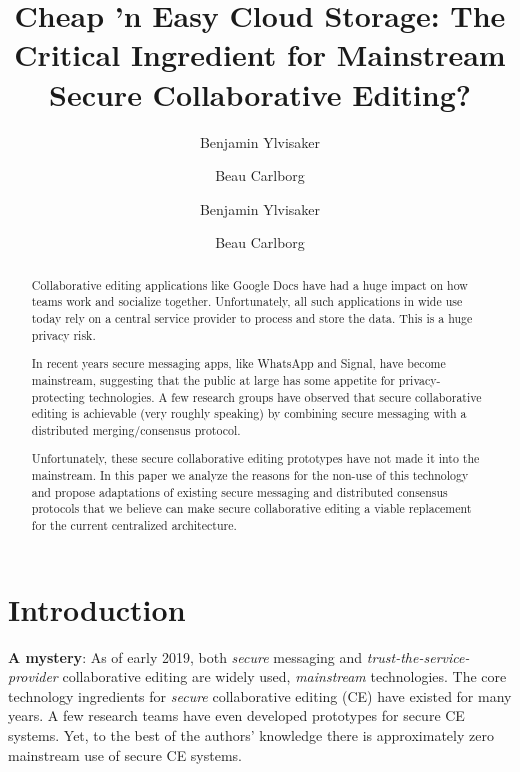 \documentclass[runningheads]{llncs}
\begin{document}
\title{Cheap 'n Easy Cloud Storage: The Critical Ingredient for Mainstream Secure Collaborative Editing?}

\author{Benjamin Ylvisaker \and
Beau Carlborg\orcidID{}}
\author{Benjamin Ylvisaker \and
Beau Carlborg}


\maketitle

\begin{abstract}

Collaborative editing applications like Google Docs have had a huge impact on how teams work and socialize together.
Unfortunately, all such applications in wide use today rely on a central service provider to process and store the data.
This is a huge privacy risk.

In recent years secure messaging apps, like WhatsApp and Signal, have become mainstream, suggesting that the public at large has some appetite for privacy-protecting technologies.
A few research groups have observed that secure collaborative editing is achievable (very roughly speaking) by combining secure messaging with a distributed merging{\slash}consensus protocol.

Unfortunately, these secure collaborative editing prototypes have not made it into the mainstream.
In this paper we analyze the reasons for the non-use of this technology and propose adaptations of existing secure messaging and distributed consensus protocols that we believe can make secure collaborative editing a viable replacement for the current centralized architecture.

\end{abstract}

\section{Introduction}

\textbf{A mystery}:
As of early 2019, both \emph{secure} messaging and \emph{trust-the-service-provider} collaborative editing are widely used, \emph{mainstream} technologies.
The core technology ingredients for \emph{secure} collaborative editing (CE) have existed for many years.
A few research teams have even developed prototypes for secure CE systems.
Yet, to the best of the authors' knowledge there is approximately zero mainstream use of secure CE systems.
\end{document}

